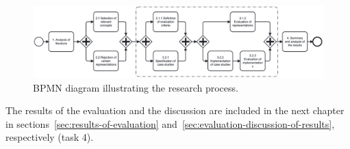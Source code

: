 \begin{figure}
    \centering
    \includegraphics[width=\textwidth]{./3-research-methodology/research-process}
    \caption{BPMN diagram illustrating the research process.}
    \label{fig:research-process}
\end{figure}

The results of the evaluation and the discussion are included in the next chapter in sections~\ref{sec:results-of-evaluation} and~\ref{sec:evaluation-discussion-of-results}, respectively (task 4).
